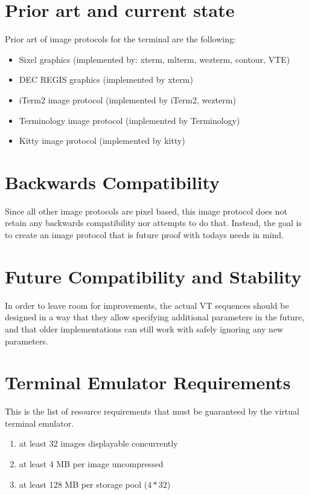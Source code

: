 \documentclass{article}
\begin{document}
\section{Prior art and current state} %

Prior art of image protocols for the terminal are the following:

\begin{itemize}
    \item Sixel graphics (implemented by: xterm, mlterm, wezterm, contour, VTE)
    \item DEC REGIS graphics (implemented by xterm)
    \item iTerm2 image protocol (implemented by iTerm2, wezterm)
    \item Terminology image protocol (implemented by Terminology)
    \item Kitty image protocol (implemented by kitty)
\end{itemize}


\section{Backwards Compatibility} %

Since all other image protocols are pixel based, this image protocol does not retain any
backwards compatibility nor attempts to do that. Instead, the goal is to create
an image protocol that is future proof with todays needs in mind.

\section{Future Compatibility and Stability} %

In order to leave room for improvements, the actual VT sequences should be designed in a way
that they allow specifying additional parameters in the future, and that older implementations
can still work with safely ignoring any new parameters.

\section{Terminal Emulator Requirements} %

This is the list of resource requirements that must be guaranteed by the virtual terminal emulator.

\begin{enumerate}
    \item at least 32 images displayable concurrently
    \item at least 4 MB per image uncompressed
    \item at least 128 MB per storage pool (\(4 * 32\))
\end{enumerate}
\end{document}
